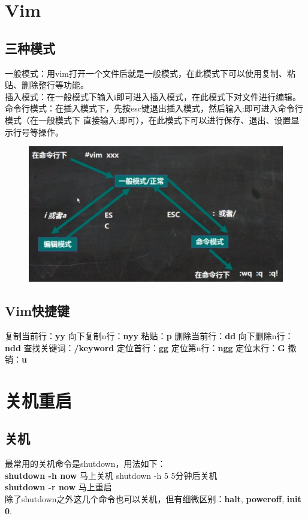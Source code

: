 \documentclass[11pt]{article}
\begin{document}
\section{Vim}

\subsection{三种模式}
 一般模式：用vim打开一个文件后就是一般模式，在此模式下可以使用复制、粘贴、删除整行等功能。  \\
 插入模式：在一般模式下输入i即可进入插入模式，在此模式下对文件进行编辑。  \\
 命令行模式：在插入模式下，先按esc键退出插入模式，然后输入:即可进入命令行模式（在一般模式下
直接输入:即可），在此模式下可以进行保存、退出、设置显示行号等操作。
\begin{figure}[htb]
    \centering
    \includegraphics[scale=0.18]{imgs/vim_mode.png}
\end{figure}

\subsection{Vim快捷键}
复制当前行：\textbf{yy} \qquad 向下复制n行：\textbf{nyy} \qquad 粘贴：\textbf{p} \qquad 删除当前行：\textbf{dd} \qquad 
向下删除n行：\textbf{ndd} \qquad 查找关键词：\textbf{/keyword} \qquad 定位首行：\textbf{gg} \qquad 定位第n行：\textbf{ngg}
\qquad 定位末行：\textbf{G} \qquad 撤销：\textbf{u}

\section{关机重启}

\subsection{关机}
最常用的关机命令是shutdown，用法如下： \\
\textbf{shutdown -h now} \qquad 马上关机 \qquad shutdown -h 5 \qquad 5分钟后关机 \\
\textbf{shutdown -r now} \qquad 马上重启 \\
除了shutdown之外这几个命令也可以关机，但有细微区别：\textbf{halt}, \textbf{poweroff}, \textbf{init 0}.
\end{document}
